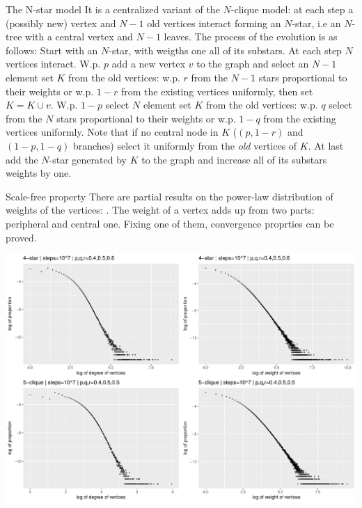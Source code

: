 \documentclass[final]{beamer}
\newlength{\onecolwid}
\newlength{\twocolwid}
\begin{document}
\begin{frame}[t]
\begin{columns}[t]
\begin{column}{\twocolwid}
\begin{columns}[t,totalwidth=\twocolwid]
\begin{column}{\onecolwid}\vspace{-.6in} %
  
\begin{block}{The N-star model}\small
  It is a centralized variant of the $N$-clique model: at each step a 
  (possibly new) vertex and $N-1$ old vertices interact forming an 
  $N$-star, i.e an $N$-tree with a central vertex and $N-1$ leaves.
  The process of the evolution is as follows: Start with an $N$-star, 
  with weigths one all of its substars. At each step $N$ vertices interact. 
  W.p. $p$ add a new vertex $v$ to the graph and select an $N-1$ element set 
  $K$ from the old vertices: w.p. $r$ from the $N-1$ stars proportional to 
  their weights or w.p. $1-r$ from the existing vertices uniformly, then set
   $K=K\cup{v}$. W.p. $1-p$ select $N$ element set $K$ from the old vertices: 
   w.p. $q$ select from the $N$ stars proportional to their weights or w.p. $1-q$ 
   from the existing vertices uniformly.  Note that if no central node in $K$ ($(p,1-r)$ 
   and $(1-p,1-q)$ branches) select it uniformly from the {\small\it old} vertices of $K$. 
   At last add the $N$-star generated by $K$ to the graph and increase all of 
   its substars weights by one.
\end{block}

\begin{block}{Scale-free property}\small
There are partial results on the power-law distribution of weights of the vertices:
\cite{Faz}. The weight of a vertex adds up from two parts: peripheral 
and central one. Fixing one of them, convergence proprties can be proved.

\vskip 2cm
  \centering
  \includegraphics[width=0.8\linewidth]{./fig/csilldist4v.pdf}
\end{block}


\end{column}
\end{columns}
\end{column}
\end{columns}
\end{frame}
\end{document}
